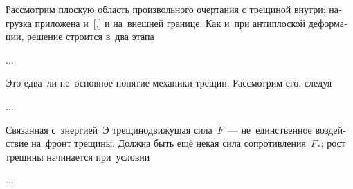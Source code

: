 
\begin{otherlanguage}{russian}

Рассмотрим плоскую область произвольного очертания с трещиной внутри; нагрузка приложена и~[,] и на~внешней границе. Как и~при антиплоской деформации, решение строится в~два этапа

...



\end{otherlanguage}



\begin{otherlanguage}{russian}

Это едва~ли не~основное понятие механики трещин. Рассмотрим его, следуя

...



\end{otherlanguage}



\begin{otherlanguage}{russian}

Связанная с~энергией~$\textit{Э}$ трещинодвижущая сила~$F$~--- не~единственное воздействие на~фронт трещины. Должна быть ещё некая сила сопротивления~$F_{*}$; рост трещины начинается при~условии

...



\end{otherlanguage}

